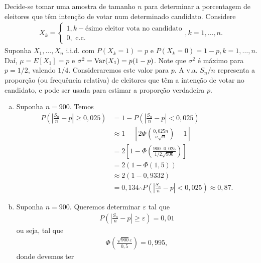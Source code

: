 \documentclass[../Notas.tex]{subfiles}
\begin{document}
\begin{example}
    Decide-se tomar uma amostra de tamanho $n$ para determinar a porcentagem de eleitores que têm intenção de votar num determinado candidato. Considere
    \begin{align*}
        X_k = \begin{cases}
            1, k-\text{ésimo eleitor vota no candidato} \\
            0, \text{ c.c.}
        \end{cases}, k = 1, \dots, n.
    \end{align*}
    Suponha $X_1, \dots, X_n$ i.i.d. com $P(X_k = 1) = p$ e $P(X_k = 0) = 1-p, k = 1, \dots, n$. Daí, $\mu = E[X_1] = p$ e $\sigma^2 = \text{Var}(X_1) = p(1-p)$. Note que $\sigma^2$ é máximo para $p=1/2$, valendo $1/4$. Consideraremos este valor para $p$. A v.a. $S_n/n$ representa a proporção (ou frequência relativa) de eleitores que têm a intenção de votar no candidato, e pode ser usada para estimar a proporção verdadeira $p$.
    \begin{enumerate}[(a)]
        \item Suponha $n=900$. Temos
        \begin{align*}
            P\left( \left| \frac{S_n}{n} - p \right| \geq 0,025 \right) &= 1 - P\left( \left| \frac{S_n}{n} - p \right| < 0,025 \right) \\
            &\approx 1 - \left[ 2\Phi\left( \frac{0,025n}{\sigma\sqrt{n}} \right) - 1 \right] \\
            &= 2\left[ 1 - \Phi\left( \frac{900\cdot 0,025}{1/2\sqrt{900}} \right) \right] \\
            &= 2(1 - \Phi(1,5)) \\
            &\approx 2(1 - 0,9332) \\
            &= 0,134 \therefore P\left( \left| \frac{S_n}{n} - p \right| < 0,025 \right) \approx 0,87.
        \end{align*}
        \item Suponha $n=900$. Queremos determinar $\varepsilon$ tal que 
        \begin{align*}
            P\left( \left| \frac{S_n}{n} - p \right| \geq \varepsilon \right) = 0,01
        \end{align*}
        ou seja, tal que
        \begin{align*}
            \Phi\left( \frac{\sqrt{900}\varepsilon}{0,5} \right) = 0,995,
        \end{align*}
        donde devemos ter
        \begin{align*}

\end{align*}
\end{enumerate}
\end{example}
\end{document}
